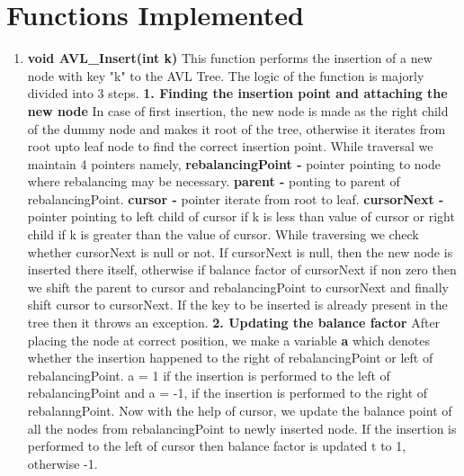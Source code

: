 \documentclass[12pt]{article}
\begin{document}
\section{Functions Implemented}
\begin{enumerate}
    \item \textbf{void AVL\_Insert(int k)}\newline 
    This function performs the insertion of a new node with key "k" to the AVL Tree. The logic of the function is majorly divided into 3 steps.\newline\newline
        \textbf{1. Finding the insertion point and attaching the new node}\newline
        In case of first insertion, the new node is made as the right child of the dummy node and makes it root of the tree, otherwise it iterates from root upto leaf node to find the correct insertion point. While traversal we maintain 4 pointers namely, \newline
        \textbf{rebalancingPoint - } pointer pointing to node where rebalancing may be necessary.\newline 
        \textbf{parent - } ponting to parent of rebalancingPoint.\newline
        \textbf{cursor - } pointer iterate from root to leaf. \newline
        \textbf{cursorNext - } pointer pointing to left child of cursor if k is less than value of cursor or right child if k is greater than the value of cursor. \newline 
        While traversing we check whether cursorNext is null or not. If cursorNext is null, then the new node is inserted there itself, otherwise if balance factor of cursorNext if non zero then we shift the parent to cursor and rebalancingPoint to cursorNext and finally shift cursor to cursorNext. If the key to be inserted is already present in the tree then it throws an exception.\newline\newline
        \textbf{2. Updating the balance factor}\newline
        After placing the node at correct position, we make a variable \textbf{a} which denotes whether the insertion happened to the right of rebalancingPoint or left of rebalancingPoint. a = 1 if the insertion is performed to the left of rebalancingPoint and a = -1, if the insertion is performed to the right of rebalanngPoint. Now with the help of cursor, we update the balance point of all the nodes from rebalancingPoint to newly inserted node. If the insertion is performed to the left of cursor then balance factor is updated t to 1, otherwise -1.\newline \newline

\end{enumerate}
\end{document}
